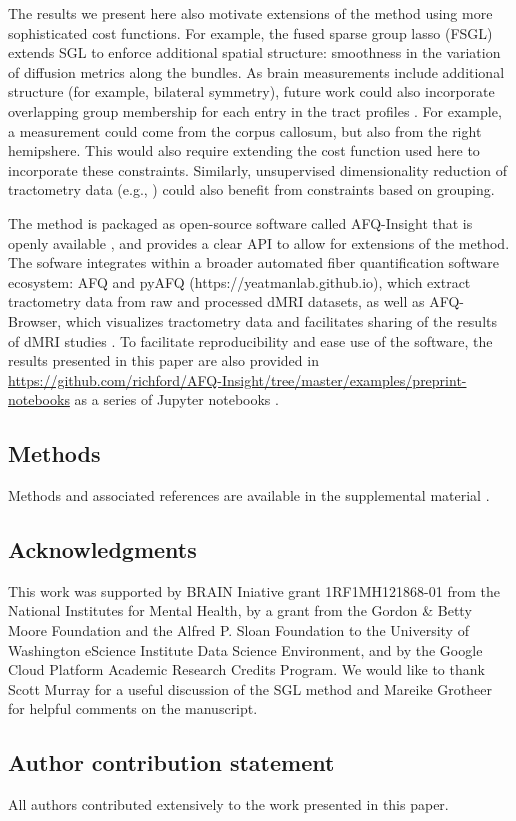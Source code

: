 \documentclass[10pt,%
               aps,%
               prl,%
               preprint,%
               superscriptaddress,%
               preprintnumbers,%
               amsmath,%
               floatfix,%
               endfloats*]{revtex4-1}
\begin{document}
The results we present here also motivate extensions of the method using more
sophisticated cost functions. For example, the fused sparse group lasso (FSGL)
\cite{zhou2012} extends SGL to enforce additional spatial structure: smoothness
in the variation of diffusion metrics along the bundles. As brain measurements
include additional structure (for example, bilateral symmetry), future work
could also incorporate overlapping group membership for each entry in the tract
profiles \cite{Rao2014-xm}. For example, a measurement could come from the
corpus callosum, but also from the right hemipshere. This would also require
extending the cost function used here to incorporate these constraints.
Similarly, unsupervised dimensionality reduction of tractometry data (e.g.,
\cite{Chamberland2019-mu}) could also benefit from constraints based on
grouping.

The method is packaged as open-source software called AFQ-Insight that is
openly available , and provides a clear API to allow for
extensions of the method. The sofware integrates within a broader automated
fiber quantification software ecosystem: AFQ \cite{yeatman2012tract} and
pyAFQ (https://yeatmanlab.github.io), which extract tractometry data from raw
and processed dMRI datasets, as well as AFQ-Browser, which visualizes
tractometry data and facilitates sharing of the results of dMRI studies
\cite{yeatman2018browser}. To facilitate reproducibility and ease use of the
software, the results presented in this paper are also provided in
\url{https://github.com/richford/AFQ-Insight/tree/master/examples/preprint-notebooks}
as a series of Jupyter notebooks \cite{kluyver2016jupyter}.

\subsection*{Methods}

Methods and associated references are available in the supplemental material
\cite{supplement}.

\subsection*{Acknowledgments}

This work was supported by BRAIN Iniative grant 1RF1MH121868-01 from the
National Institutes for Mental Health, by a grant from the Gordon \& Betty
Moore Foundation and the Alfred P. Sloan Foundation to the University of
Washington eScience Institute Data Science Environment, and by the Google
Cloud Platform Academic Research Credits Program. We would like to thank
Scott Murray for a useful discussion of the SGL method and Mareike Grotheer
for helpful comments on the manuscript.

\subsection*{Author contribution statement}

All authors contributed extensively to the work presented in this paper.

\printfigures



\end{document}
